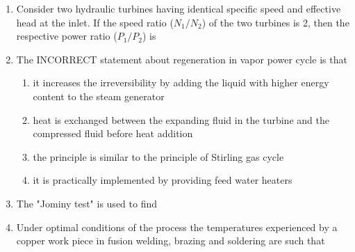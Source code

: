\documentclass[journal,11pt,onecolumn]{IEEEtran}
\begin{document}
\begin{enumerate}
    \item Consider two hydraulic turbines having identical specific speed and effective head at the inlet. If the speed ratio ($N_1/N_2$) of the two turbines is 2, then the respective power ratio ($P_1/P_2$) is \underline{\hspace{2cm}}

    \item The INCORRECT statement about regeneration in vapor power cycle is that

          \begin{enumerate}

              \item it increases the irreversibility by adding the liquid with higher energy content to the steam generator

              \item heat is exchanged between the expanding fluid in the turbine and the compressed fluid before heat addition

              \item the principle is similar to the principle of Stirling gas cycle

              \item it is practically implemented by providing feed water heaters

          \end{enumerate}

    \item The "Jominy test" is used to find

          \begin{enumerate}


          \end{enumerate}

    \item Under optimal conditions of the process the temperatures experienced by a copper work piece in fusion welding, brazing and soldering are such that


\end{enumerate}
\end{document}
